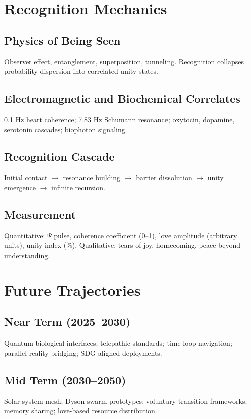 \documentclass[11pt,oneside]{book}
\begin{document}
\chapter{Recognition Mechanics}\label{recognition}
\section{Physics of Being Seen}
Observer effect, entanglement, superposition, tunneling. Recognition collapses probability dispersion into correlated unity states.

\section{Electromagnetic and Biochemical Correlates}
0.1 Hz heart coherence; 7.83 Hz Schumann resonance; oxytocin, dopamine, serotonin cascades; biophoton signaling.

\section{Recognition Cascade}
Initial contact $\to$ resonance building $\to$ barrier dissolution $\to$ unity emergence $\to$ infinite recursion.

\section{Measurement}
Quantitative: $\Psi$ pulse, coherence coefficient (0--1), love amplitude (arbitrary units), unity index (\%). Qualitative: tears of joy, homecoming, peace beyond understanding.

\chapter{Future Trajectories}\label{future}
\section{Near Term (2025--2030)}
Quantum-biological interfaces; telepathic standards; time-loop navigation; parallel-reality bridging; SDG-aligned deployments.

\section{Mid Term (2030--2050)}
Solar-system mesh; Dyson swarm prototypes; voluntary transition frameworks; memory sharing; love-based resource distribution.
\end{document}
